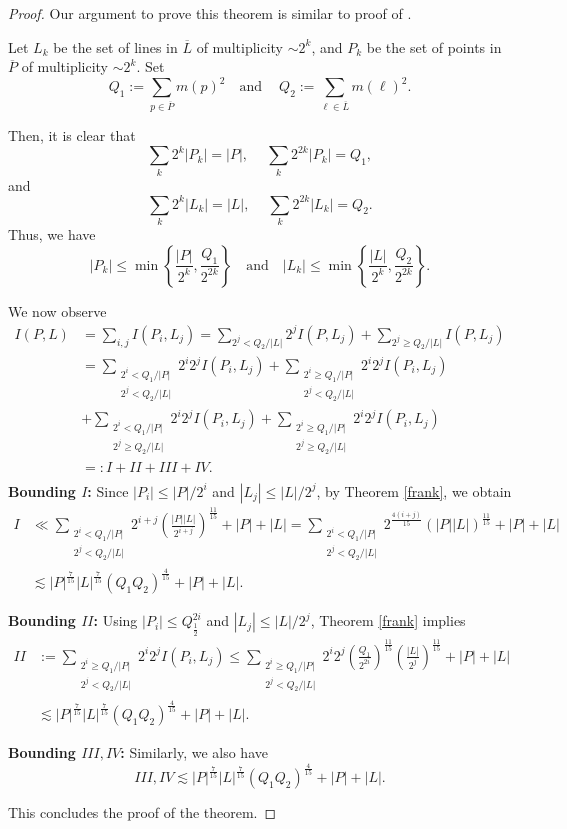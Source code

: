 \documentclass[11pt]{article}
\begin{document}
\begin{proof}
    Our argument to prove this theorem is similar to proof of \cite[Lemma 2.12]{LuPe}. 

Let $L_k$ be the set of lines in $\overline{L}$ of multiplicity $\sim 2^k$, and $P_k$ be the set of points in $\overline{P}$ of multiplicity $\sim 2^k$. Set 
\[Q_1:=\sum_{p\in \overline{P}}m(p)^2 \quad \text{and}\quad ~Q_2:=\sum_{\ell\in \overline{L}}m(\ell)^2.\]

Then, it is clear that 
\[\sum_{k}2^k|P_k|=|P|,\quad ~\sum_{k}2^{2k}|P_k|=Q_1,\]
and
\[\sum_{k}2^k|L_k|=|L|,\quad ~\sum_{k}2^{2k}|L_k|=Q_2.\]
Thus, we have 
\[|P_k|\le \min \left\lbrace\frac{|P|}{2^k}, \frac{Q_1}{2^{2k}}\right\rbrace \quad \text{and} \quad |L_k|\le \min \left\lbrace\frac{|L|}{2^k}, \frac{Q_2}{2^{2k}}\right\rbrace.\]

We now observe 
\begin{align*}
    I(P, L)&=\sum_{i, j}I(P_i, L_j)=\sum_{2^j<Q_2/|L|}2^jI(P, L_j)+\sum_{2^j\ge Q_2/|L|}I(P, L_j)\\
    &=\sum_{\substack{2^i<Q_1/|P|\\2^j<Q_2/|L|}}2^i2^jI(P_i, L_j)+\sum_{\substack{2^i\ge Q_1/|P|\\2^j<Q_2/|L|}}2^i2^jI(P_i, L_j)\\&+\sum_{\substack{2^i<Q_1/|P|\\2^j\ge Q_2/|L|}}2^i2^jI(P_i, L_j)+\sum_{\substack{2^i\ge Q_1/|P|\\2^j\ge Q_2/|L|}}2^i2^jI(P_i, L_j)\\
    &=: I+II+III+IV.\\
\end{align*}
{\bf Bounding $I$:} Since $|P_i|\le |P|/2^i$ and $|L_j|\le |L|/2^j$, by Theorem \ref{frank}, we obtain 
\begin{align*}
I&\ll \sum_{\substack{2^i<Q_1/|P|\\
2^j<Q_2/|L|}}2^{i+j}\left(\frac{|P||L|}{2^{i+j}}\right)^{\frac{11}{15}}+|P|+|L|=\sum_{\substack{2^i<Q_1/|P|\\
2^j<Q_2/|L|}}2^{\frac{4(i+j)}{15}}(|P||L|)^{\frac{11}{15}}+|P|+|L|\\
&\lesssim |P|^{\frac{7}{15}}|L|^{\frac{7}{15}}(Q_1Q_2)^{\frac{4}{15}}+|P|+|L|.
\end{align*}

{\bf Bounding $II$:} Using $|P_i|\le Q_\frac{1}{2}^{2i}$ and $|L_j|\le |L|/2^j$, Theorem \ref{frank} implies
\begin{align*}
    II&:=\sum_{\substack{2^i\ge Q_1/|P|\\2^j<Q_2/|L|}}2^i2^jI(P_i, L_j)\le \sum_{\substack{2^i\ge Q_1/|P|\\2^j<Q_2/|L|}}2^i2^j \left(\frac{Q_1}{2^{2i}}\right)^{\frac{11}{15}}\left(\frac{|L|}{2^j}\right)^{\frac{11}{15}}+|P|+|L|\\
    &\lesssim |P|^{\frac{7}{15}}|L|^{\frac{7}{15}}(Q_1Q_2)^{\frac{4}{15}}+|P|+|L|.
\end{align*}

{\bf Bounding $III, IV$:} Similarly, we also have 
\[III, IV\lesssim |P|^{\frac{7}{15}}|L|^{\frac{7}{15}}(Q_1Q_2)^{\frac{4}{15}}+|P|+|L|.\]

This concludes the proof of the theorem.
\end{proof}
\end{document}

